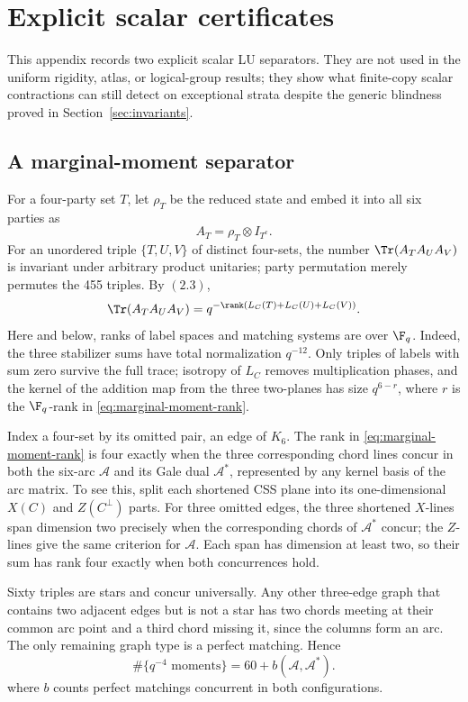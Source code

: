 \section{Explicit scalar certificates}\label{sec:scalar-certificates}

This appendix records two explicit scalar LU separators.  They are not
used in the uniform rigidity, atlas, or logical-group results; they show
what finite-copy scalar contractions can still detect on exceptional
strata despite the generic blindness proved in
Section~\ref{sec:invariants}.

\subsection{A marginal-moment separator}

For a four-party set \(T\), let \(\rho_T\) be the reduced state and embed
it into all six parties as
\[
 A_T=\rho_T\otimes I_{T^c}.
\]
For an unordered triple \(\{T,U,V\}\) of distinct four-sets, the number
\(\Tr(A_TA_UA_V)\) is invariant under arbitrary product unitaries; party
permutation merely permutes the 455 triples.  By \((2.3)\),
\begin{equation}\label{eq:marginal-moment-rank}
 \Tr(A_TA_UA_V)=q^{-\rank(L_C(T)+L_C(U)+L_C(V))}.
\end{equation}
Here and below, ranks of label spaces and matching systems are over
\(\F_q\).
Indeed, the three stabilizer sums have total normalization \(q^{-12}\).
Only triples of labels with sum zero survive the full trace; isotropy of
\(L_C\) removes multiplication phases, and the kernel of the addition map
from the three two-planes has size \(q^{6-r}\), where \(r\) is the
\(\F_q\)-rank in \eqref{eq:marginal-moment-rank}.

Index a four-set by its omitted pair, an edge of \(K_6\).  The rank in
\eqref{eq:marginal-moment-rank} is four exactly when the three corresponding chord lines
concur in both the six-arc \(\mathcal A\) and its Gale dual
\(\mathcal A^*\), represented by any kernel basis of the arc matrix.
To see this, split each shortened CSS plane into its one-dimensional
\(X(C)\) and \(Z(C^\perp)\) parts.  For three omitted edges, the three
shortened \(X\)-lines span dimension two precisely when the corresponding
chords of \(\mathcal A^*\) concur; the \(Z\)-lines give the same criterion
for \(\mathcal A\).  Each span has dimension at least two, so their sum
has rank four exactly when both concurrences hold.

Sixty triples are stars and concur universally.  Any other three-edge
graph that contains two adjacent edges but is not a star has two chords
meeting at their common arc point and a third chord missing it, since the
columns form an arc.  The only remaining graph type is a perfect
matching.  Hence
\begin{equation}\label{eq:marginal-moment-count}
\#\{q^{-4}\text{ moments}\}=60+b(\mathcal A,\mathcal A^*).
\end{equation}
where \(b\) counts perfect matchings concurrent in both configurations.

